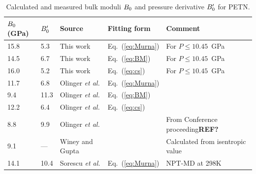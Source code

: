 \documentclass[prb,aps,nobibnotes,twocolumn,doublespace,twocolumngrid,superbib]{revtex4}
\begin{document}
\begin{table}[p]
\begin{center}
\begin{tabular}{lllll}
\hline\hline
$B_0$(GPa) &   ${B'_0}$   &   Source  &    Fitting form &      Comment \\
\hline
15.8 & 5.3 & This work &  Eq.~(\ref{eq:Murna}) & For $P \le 10.45$~GPa \\
14.5 & 6.7 & This work & Eq.~(\ref{eq:BM}) & For $P \le 10.45$~GPa \\
16.0 & 5.2 & This work & Eq.~(\ref{eq:cs}) & For $P \le 10.45$~GPa \\
11.7 & 6.8 & Olinger {\it et al.}\cite{Olinger_1975v62} & Eq.~(\ref{eq:Murna}) \\
9.4 & 11.3 & Olinger {\it et al.}\cite{Olinger_1975v62} & Eq.~(\ref{eq:BM}) \\
12.2 & 6.4 & Olinger {\it et al.}\cite{Olinger_1975v62} & Eq.~(\ref{eq:cs}) \\
8.8 & 9.9 &   Olinger {\it et al.}&   &        From Conference proceeding{\bf REF?} \\
 9.1 & --- &   Winey and Gupta\cite{Winey_2001v90} &     & Calculated from isentropic value \\
14.1 &10.4 &Sorescu {\it et al.}\cite{Sorescu_1999v103} & Eq.~(\ref{eq:Murna})&         NPT-MD at 298K\\
\hline\hline
\end{tabular}
\end{center}
\caption{Calculated and measured bulk moduli $B_0$ and pressure
derivative ${B'_0}$ for PETN.
}
\label{tab:table3}
\end{table}

 
\end{document}
